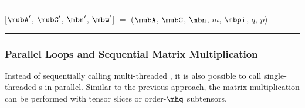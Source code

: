 \begin{algorithm}[t]
\footnotesize
\DontPrintSemicolon
\SetAlgoVlined
{}
%
%
%
\hrule
\BlankLine
{
	[$\mubA'$, $\mubC'$, $\mbn'$, $\mbw'$] $=$ \reshape($\mubA$, $\mubC$, $\mbn$, $m$, $\mbpi$, $q$, $p$)\;
	{
		{
			\;
		}
	}
}
\BlankLine
\hrule
\caption{%
\footnotesize
Function  is an optimized version of Algorithm \ref{alg:ttm.sequential.coalesced}.
The  function transforms the order-$p$ tensors $\mubA$ and $\mubC$ with layout tuple $\mbpi$ and their respective dimension tuples $\mbn$ and $\mbm$ into order-$4$ tensors $\mubA'$ and $\mubC'$ with layout tuple $\mbpi'$ and their respective dimension tuples $\mbn'$ and $\mbm'$ where $\mbn' = (n_{\pi_1},\mhn_{\pi_2},n_q,\mhn_{\pi_4})$ and $m_3' = m$ and $n_k' = m_k'$ for $k \neq 3$.
Each thread calls multiple single-threaded  functions each of which executes a slice-matrix multiplication with the order-$2$ tensor slices $\mubA_{ij}'$ and $\mubC_{ij}'$.
Matrix $\mbB$ has the row-major storage format.
\label{alg:ttm.slice.fused.parallel}
}
\end{algorithm}


\subsubsection{Parallel Loops and Sequential Matrix Multiplication}
Instead of sequentially calling multi-threaded , it is also possible to call single-threaded s in parallel.
Similar to the previous approach, the matrix multiplication can be performed with tensor slices or order-$\mhq$ subtensors.


